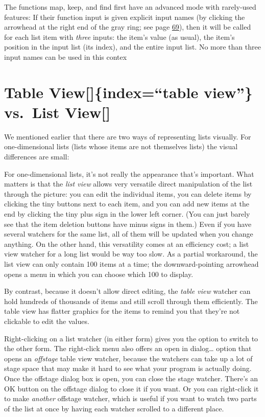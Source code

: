 \documentclass[
  letterpaper,
]{book}
\begin{document}
The functions map, keep, and find first have an advanced mode with
rarely-used features: If their function input is given explicit input
names (by clicking the arrowhead at the right end of the gray ring; see
page \hyperref[formal-parameters]{69}), then it will be called for each
list item with \emph{three} inputs: the item's value (as usual), the
item's position in the input list (its index), and the entire input
list. No more than three input names can be used in this contex

\section{}\label{section-1}

\section{Table View{[}{]}\{index=``table view''\} vs.~List
View{[}{]}}\label{table-viewindextable-view-vs.-list-view}

We mentioned earlier that there are two ways of representing lists
visually. For one-dimensional lists (lists whose items are not
themselves lists) the visual differences are small:

For one-dimensional lists, it's not really the appearance that's
important. What matters is that the \emph{list view} allows very
versatile direct manipulation of the list through the picture: you can
edit the individual items, you can delete items by clicking the tiny
buttons next to each item, and you can add new items at the end by
clicking the tiny plus sign in the lower left corner. (You can just
barely see that the item deletion buttons have minus signs in them.)
Even if you have several watchers for the same list, all of them will be
updated when you change anything. On the other hand, this versatility
comes at an efficiency cost; a list view watcher for a long list would
be way too slow. As a partial workaround, the list view can only contain
100 items at a time; the downward-pointing arrowhead opens a menu in
which you can choose which 100 to display.

By contrast, because it doesn't allow direct editing, the \emph{table
view} watcher can hold hundreds of thousands of items and still scroll
through them efficiently. The table view has flatter graphics for the
items to remind you that they're not clickable to edit the values.

Right-clicking on a list watcher (in either form) gives you the option
to switch to the other form. The right-click menu also offers an open in
dialog\ldots{} option that opens an \emph{offstage} table view watcher,
because the watchers can take up a lot of stage space that may make it
hard to see what your program is actually doing. Once the offstage
dialog box is open, you can close the stage watcher. There's an OK
button on the offstage dialog to close it if you want. Or you can
right-click it to make \emph{another} offstage watcher, which is useful
if you want to watch two parts of the list at once by having each
watcher scrolled to a different place.
\end{document}
